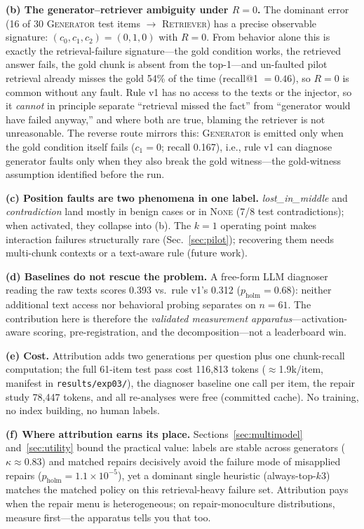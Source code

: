 \documentclass[conference]{IEEEtran}
\begin{document}
\textbf{(b) The generator--retriever ambiguity under $R{=}0$.} The
dominant error (16 of 30 \textsc{Generator} test items $\to$
\textsc{Retriever}) has a precise observable signature:
$(c_0,c_1,c_2)=(0,1,0)$ with $R{=}0$. From behavior alone this is exactly
the retrieval-failure signature---the gold condition works, the retrieved
answer fails, the gold chunk is absent from the top-1---and un-faulted
pilot retrieval already misses the gold 54\% of the time (recall@1
$=0.46$), so $R{=}0$ is common without any fault. Rule v1 has no access to
the texts or the injector, so it \emph{cannot} in principle separate
``retrieval missed the fact'' from ``generator would have failed anyway,''
and where both are true, blaming the retriever is not unreasonable. The
reverse route mirrors this: \textsc{Generator} is emitted only when the
gold condition itself fails ($c_1{=}0$; recall 0.167), i.e., rule v1 can
diagnose generator faults only when they also break the gold
witness---the gold-witness assumption identified before the run.

\textbf{(c) Position faults are two phenomena in one label.}
\emph{lost\_in\_middle} and \emph{contradiction} land mostly in benign
cases or in \textsc{None} (7/8 test contradictions); when activated, they
collapse into (b). The $k{=}1$ operating point makes interaction failures
structurally rare (Sec.~\ref{sec:pilot}); recovering them needs multi-chunk
contexts or a text-aware rule (future work).

\textbf{(d) Baselines do not rescue the problem.} A free-form LLM
diagnoser reading the raw texts scores 0.393 vs.\ rule v1's 0.312
($p_{\text{holm}}{=}0.68$): neither additional text access nor behavioral
probing separates on $n{=}61$. The contribution here is therefore the
\emph{validated measurement apparatus}---activation-aware scoring,
pre-registration, and the decomposition---not a leaderboard win.

\textbf{(e) Cost.} Attribution adds two generations per question plus one
chunk-recall computation; the full 61-item test pass cost 116{,}813
tokens ($\approx$1.9k/item, manifest in \texttt{results/exp03/}), the
diagnoser baseline one call per item, the repair study 78{,}447 tokens,
and all re-analyses were free (committed cache). No training, no index
building, no human labels.

\textbf{(f) Where attribution earns its place.}
Sections~\ref{sec:multimodel} and~\ref{sec:utility} bound the practical
value: labels are stable across generators ($\kappa{\approx}0.83$) and
matched repairs decisively avoid the failure mode of misapplied repairs
($p_{\text{holm}}{=}1.1{\times}10^{-5}$), yet a dominant single heuristic
(always-top-$k$3) matches the matched policy on this retrieval-heavy
failure set. Attribution pays when the repair menu is heterogeneous; on
repair-monoculture distributions, measure first---the apparatus tells you
that too.
\end{document}
